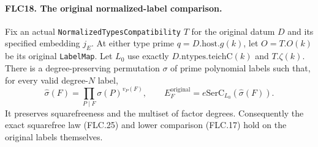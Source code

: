 \documentclass[11pt,a4paper]{article}
\numberwithin{equation}{section}
\theoremstyle{remark}\newtheorem{remark}[theorem]{Remark}
\begin{document}
\paragraph{FLC18. The original normalized-label comparison.}
\label{claim:FLC18}
\mbox{}\par\noindent
Fix an actual \texttt{Normalized\allowbreak Types\allowbreak Compatibility} $T$ for
the original datum $D$ and its specified embedding $j_E$.
At either type prime $q=D.\mathrm{host}.g(k)$, let $O=T.O(k)$
be its original \texttt{Label\allowbreak Map}.  Let $L_0$ use exactly
$D.\mathrm{ntypes}.\mathrm{teichC}(k)$ and $T.\zeta(k)$.
There is a degree-preserving permutation $\sigma$ of prime
polynomial labels such that, for every valid degree-$N$ label,
\[
 \widehat\sigma(F)=\prod_{P\mid F}\sigma(P)^{v_P(F)},\qquad
 E_F^{\mathrm{original}}=e\mathrm{SerC}_{L_0}(\widehat\sigma(F)).
 \tag{FLC.26}
\]
It preserves squarefreeness and the multiset of factor degrees.
Consequently the exact squarefree law (FLC.25) and lower
comparison (FLC.17) hold on the original labels themselves.
\end{document}
